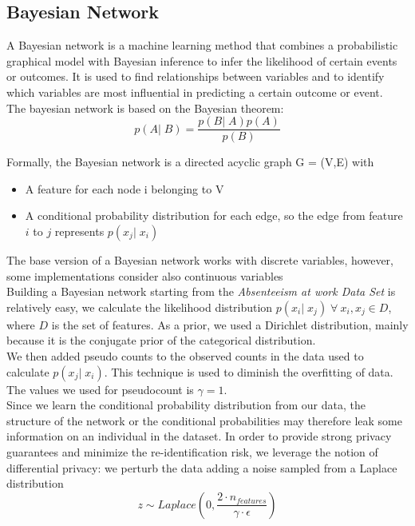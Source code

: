\subsection{Bayesian Network}
A Bayesian network is a machine learning method that combines a probabilistic graphical model with Bayesian inference to infer the likelihood of certain events or outcomes. It is used to find relationships between variables and to identify which variables are most influential in predicting a certain outcome or event. \\
The bayesian network is based on the Bayesian theorem:
\begin{equation*}
    p(A|\;B) = \frac{p(B|\;A)p(A)}{p(B)}
\end{equation*}

Formally, the Bayesian network is a directed acyclic graph G = (V,E) with
\begin{itemize}
    \item A feature for each node i belonging to V
    \item A conditional probability distribution for each edge, so the edge from feature $i$ to $j$ represents $p(x_j|\;x_i)$
  \end{itemize}
The base version of a Bayesian network works with discrete variables, however, some implementations consider also continuous variables \cite{chen2017learning} \\
Building a Bayesian network starting from the \textit{Absenteeism at work Data Set} is relatively easy, we calculate the likelihood distribution $p(x_i|\;x_j)\;\forall\:x_i, x_j \in D$, where $D$ is the set of features. As a prior, we used a Dirichlet distribution, mainly because it is the conjugate prior of the categorical distribution. \\
We then added pseudo counts to the observed counts in the data used to calculate $p(x_j|\;x_i)$. This technique is used to diminish the overfitting of data. The values we used for pseudocount is $\gamma=1$. \\
Since we learn the conditional probability distribution from our data, the structure of the network or the conditional probabilities may therefore leak some information on an individual in the dataset. In order to provide strong privacy guarantees and minimize the re-identification risk, we leverage the notion of differential privacy: we perturb the data adding a noise sampled from a Laplace distribution 
\begin{equation*}
    z \sim Laplace \left(0, \frac{2 \cdot n_{features}}{\gamma \cdot \epsilon} \right)
\end{equation*}
